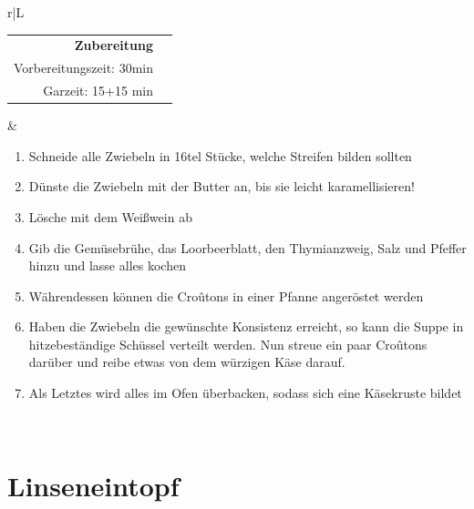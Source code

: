 \documentclass[a4paper, 12pt]{scrbook} 								%
\numberwithin{equation}{section} 									%
\begin{document}
			\newpage
			\begin{tabularx}{\textwidth}{r|L}
		
		
			\begin{tabular}[t]{rr}
				\textbf{Zubereitung}	\\
				\small Vorbereitungszeit: 30min	\\
				\small Garzeit:	15+15 min		\\
			\end{tabular}			&	\begin{enumerate}[]
											\item Schneide alle Zwiebeln in 16tel Stücke, welche Streifen bilden sollten
											\item Dünste die Zwiebeln mit der Butter an, bis sie leicht karamellisieren!
											\item Lösche mit dem Weißwein ab
											\item Gib die Gemüsebrühe, das Loorbeerblatt, den Thymianzweig, Salz und Pfeffer hinzu und lasse alles kochen
											\item Währendessen können die Croûtons in einer Pfanne angeröstet werden
											\item Haben die Zwiebeln die gewünschte Konsistenz erreicht, so kann die Suppe in hitzebeständige Schüssel verteilt werden. Nun streue ein paar Croûtons darüber und reibe etwas von dem würzigen Käse darauf.
											\item Als Letztes wird alles im Ofen überbacken, sodass sich eine Käsekruste bildet 
										\end{enumerate}	\\
		\end{tabularx}
		\newpage



		\section{Linseneintopf}	\label{linseneintopf}
\end{document}
